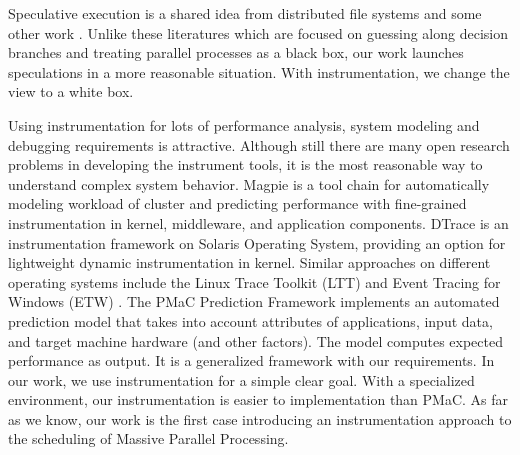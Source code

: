 Speculative execution is a shared idea from distributed file systems
\cite{Nightingale:2006:SED:1189256.1189258} and some other work
\cite{Su:2007:AIC:1294261.1294284} . Unlike these literatures which are focused on guessing
along decision branches and treating parallel processes as a black box, our work launches
speculations in a more reasonable situation. With instrumentation, we change the view to a
white box.

Using instrumentation for lots of performance analysis, system modeling and debugging
requirements is attractive. Although still there are many open research problems in developing
the instrument tools, it is the most reasonable way to understand complex system
behavior. Magpie \cite{Barham:2004:UMR:1251254.1251272} is a tool chain for automatically
modeling workload of cluster and predicting performance with fine-grained instrumentation
in kernel, middleware, and application components. DTrace
\cite{Cantrill:2004:DIP:1247415.1247417} is an instrumentation framework on Solaris
Operating System, providing an option for lightweight dynamic instrumentation in kernel.
Similar approaches on different operating systems include the Linux Trace Toolkit (LTT)
\cite{Yaghmour:2000:MCS:1267724.1267726} and Event Tracing for Windows (ETW) \cite{etw}.
The PMaC Prediction Framework \cite{Carrington:2006:PPF:1134241.1708446} implements
an automated prediction model that takes into account attributes of
applications, input data, and target machine hardware (and other factors). The model
computes expected performance as output. It is a generalized framework with our
requirements. In our work, we use instrumentation for a simple clear goal. With a
specialized environment, our instrumentation is easier to implementation than PMaC. As far
as we know, our work is the first case introducing an instrumentation approach to the
scheduling of Massive Parallel Processing.

